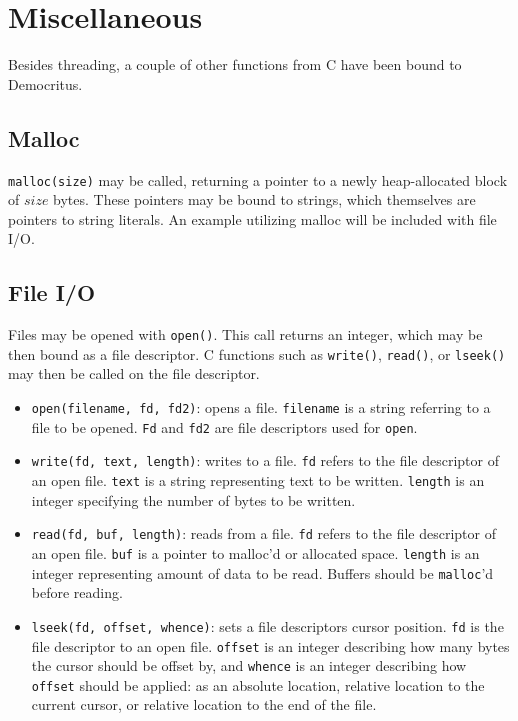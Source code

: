 \section{Miscellaneous}
	Besides threading, a couple of other functions from C have been bound to Democritus.

	\subsection{Malloc}
		\texttt{malloc(size)} may be called, returning a pointer to a newly heap-allocated block of $size$ bytes. These pointers may be bound to strings, which themselves are pointers to string literals. An example utilizing malloc will be included with file I/O.

	\subsection{File I/O}
		Files may be opened with \texttt{open()}. This call returns an integer, which may be then bound as a file descriptor. C functions such as \texttt{write()}, \texttt{read()}, or \texttt{lseek()} may then be called on the file descriptor. 

		\begin{itemize}
			\item \texttt{open(filename, fd, fd2)}: opens a file. \texttt{filename} is a string referring to a file to be opened. \texttt{Fd} and \texttt{fd2} are file descriptors used for \texttt{open}.
			\item \texttt{write(fd, text, length)}: writes to a file. \texttt{fd} refers to the file descriptor of an open file. \texttt{text} is a string representing text to be written. \texttt{length} is an integer specifying the number of bytes to be written.
			\item \texttt{read(fd, buf, length)}: reads from a file. \texttt{fd} refers to the file descriptor of an open file. \texttt{buf} is a pointer to malloc'd or allocated space. \texttt{length} is an integer representing amount of data to be read. Buffers should be \texttt{malloc}'d before reading. 
			\item \texttt{lseek(fd, offset, whence)}: sets a file descriptors cursor position. \texttt{fd} is the file descriptor to an open file. \texttt{offset} is an integer describing how many bytes the cursor should be offset by, and \texttt{whence} is an integer describing how \texttt{offset} should be applied: as an absolute location, relative location to the current cursor, or relative location to the end of the file.
		\end{itemize}


